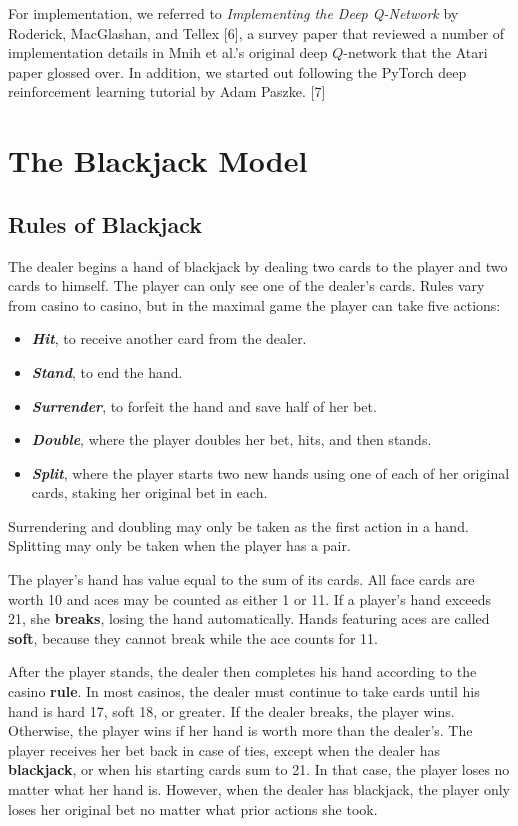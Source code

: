 \documentclass{article}
\begin{document}
For implementation, we referred to \textit{Implementing the Deep Q-Network} by Roderick, MacGlashan, and Tellex [6], a survey paper that reviewed a number of implementation details in Mnih et al.'s original deep $Q$-network that the Atari paper glossed over. In addition, we started out following the PyTorch deep reinforcement learning tutorial by Adam Paszke. [7]  

\section{The Blackjack Model}

\subsection{Rules of Blackjack} The dealer begins a hand of blackjack by dealing two cards to the player and two cards to himself. The player can only see one of the dealer's cards. Rules vary from casino to casino, but in the maximal game the player can take five actions: 

\begin{itemize}
	\item \textit{\textbf{Hit}}, to receive another card from the dealer. 
	\item \textit{\textbf{Stand}}, to end the hand. 
	\item \textit{\textbf{Surrender}}, to forfeit the hand and save half of her bet. 
	\item \textit{\textbf{Double}}, where the player doubles her bet, hits, and then stands. 
	\item \textit{\textbf{Split}}, where the player starts two new hands using one of each of her original cards, staking her original bet in each.  
\end{itemize} 

Surrendering and doubling may only be taken as the first action in a hand. Splitting may only be taken when the player has a pair.

The player's hand has value equal to the sum of its cards. All face cards are worth 10 and aces may be counted as either 1 or 11. If a player's hand exceeds 21, she \textbf{breaks}, losing the hand automatically. Hands featuring aces are called \textbf{soft}, because they cannot break while the ace counts for 11. 

After the player stands, the dealer then completes his hand according to the casino \textbf{rule}. In most casinos, the dealer must continue to take cards until his hand is hard 17, soft 18, or greater. If the dealer breaks, the player wins. Otherwise, the player wins if her hand is worth more than the dealer's. The player receives her bet back in case of ties, except when the dealer has \textbf{blackjack}, or when his starting cards sum to 21. In that case, the player loses no matter what her hand is. However, when the dealer has blackjack, the player only loses her original bet no matter what prior actions she took. 
\end{document}
